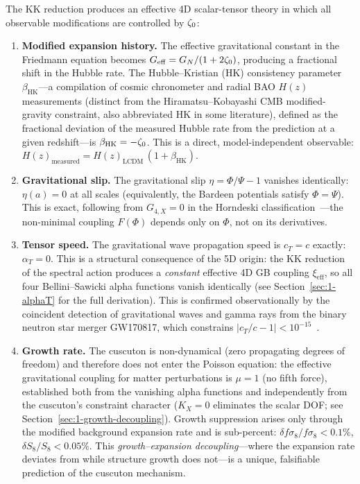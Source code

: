 The KK reduction produces an effective 4D scalar-tensor theory in which all observable modifications are controlled by $\zeta_0$:
\begin{enumerate}
\item \textbf{Modified expansion history.} The effective gravitational constant in the Friedmann equation becomes $G_{\mathrm{eff}} = G_N/(1 + 2\zeta_0)$, producing a fractional shift in the Hubble rate. The Hubble--Kristian (HK) consistency parameter $\beta_{\mathrm{HK}}$---a compilation of cosmic chronometer and radial BAO $H(z)$ measurements (distinct from the Hiramatsu--Kobayashi CMB modified-gravity constraint, also abbreviated HK in some literature), defined as the fractional deviation of the measured Hubble rate from the \LCDM{} prediction at a given redshift---is $\beta_{\mathrm{HK}} = -\zeta_0$. This is a direct, model-independent observable: $H(z)_{\mathrm{measured}} = H(z)_{\mathrm{\scriptscriptstyle LCDM}}\,(1 + \beta_{\mathrm{HK}})$.

\item \textbf{Gravitational slip.} The gravitational slip $\eta = \Phi/\Psi - 1$ vanishes identically: $\eta(a) = 0$ at all scales (equivalently, the Bardeen potentials satisfy $\Phi = \Psi$). This is exact, following from $G_{4,X} = 0$ in the Horndeski classification~\cite{ch1:horndeski74}---the non-minimal coupling $F(\Phi)$ depends only on $\Phi$, not on its derivatives.

\item \textbf{Tensor speed.} The gravitational wave propagation speed is $c_T = c$ exactly: $\alpha_T = 0$. This is a structural consequence of the 5D origin: the KK reduction of the spectral action produces a \emph{constant} effective 4D GB coupling $\xi_{\mathrm{eff}}$, so all four Bellini--Sawicki alpha functions vanish identically (see Section~\ref{sec:1-alphaT} for the full derivation). This is confirmed observationally by the coincident detection of gravitational waves and gamma rays from the binary neutron star merger GW170817, which constrains $|c_T/c - 1| < 10^{-15}$~\cite{ch1:gw170817,ch1:creminelli17,ch1:ezquiaga17}.

\item \textbf{Growth rate.} The cuscuton is non-dynamical (zero propagating degrees of freedom) and therefore does not enter the Poisson equation: the effective gravitational coupling for matter perturbations is $\mu = 1$ (no fifth force), established both from the vanishing alpha functions and independently from the cuscuton's constraint character ($K_X = 0$ eliminates the scalar DOF; see Section~\ref{sec:1-growth-decoupling}). Growth suppression arises only through the modified background expansion rate and is sub-percent: $\delta f\sigma_8 / f\sigma_8 < 0.1\%$, $\delta S_8 / S_8 < 0.05\%$. This \emph{growth--expansion decoupling}---where the expansion rate deviates from \LCDM{} while structure growth does not---is a unique, falsifiable prediction of the cuscuton mechanism.
\end{enumerate}

